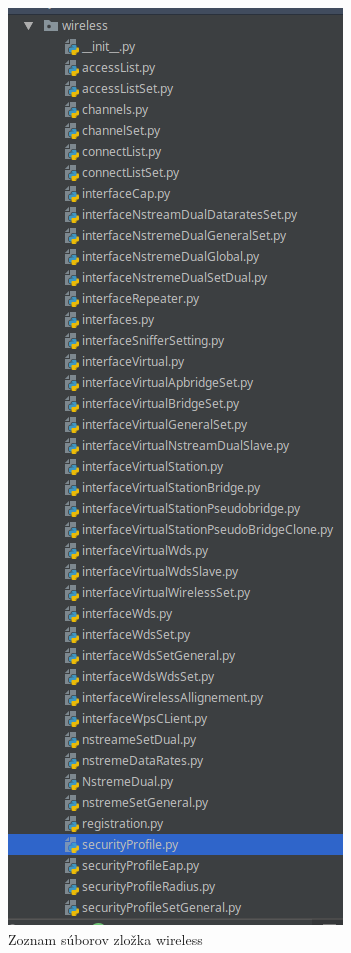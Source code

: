 \begin{figure}[H]
\centering
\includegraphics[scale=0.6]{../text/wifi.png}
\caption{Zoznam súborov zložka wireless}
\label{fig:wifi}
\end{figure}
